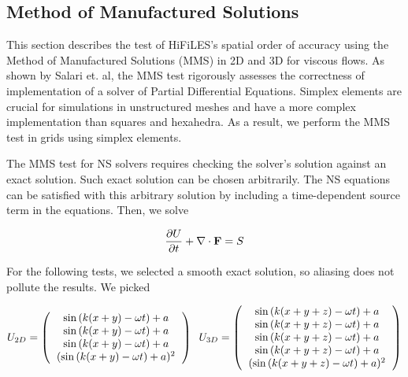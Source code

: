 \graphicspath{{figures_manufactured/}}%


\subsection{Method of Manufactured Solutions}

This section describes the test of HiFiLES's spatial order of accuracy using the Method of Manufactured Solutions (MMS) in 2D and 3D for viscous flows. As shown by Salari et. al\cite{salari2000code}, the MMS test rigorously assesses the correctness of implementation of a solver of Partial Differential Equations. Simplex elements are crucial for simulations in unstructured meshes and have a more complex implementation than squares and hexahedra. As a result, we perform the MMS test in grids using simplex elements.

The MMS test for NS solvers requires checking the solver's solution against an exact solution. Such exact solution can be chosen arbitrarily. The NS equations can be satisfied with this arbitrary solution by including a time-dependent source term in the equations. Then, we solve

\begin{equation}
\frac{\partial U}{\partial t} +  \nabla \cdot {\bf F} = S
\end{equation}

For the following tests, we selected a smooth exact solution, so aliasing does not pollute the results. We picked

\begin{equation}\label{eq:NSwithSource}
U_{2D} = \l(
\begin{tabular}{c}
$\sin{(k(x+y) - \omega t)} + a$\\
$\sin{(k(x+y) - \omega t)} + a$\\
$\sin{(k(x+y) - \omega t)} + a$\\
$(\sin{(k(x+y) - \omega t)} + a)^2$
\end{tabular}
\r) \;\; 
U_{3D} = \l(
\begin{tabular}{c}
$\sin{(k(x+y+z) - \omega t)} + a$\\
$\sin{(k(x+y+z) - \omega t)} + a$\\
$\sin{(k(x+y+z) - \omega t)} + a$\\
$\sin{(k(x+y+z) - \omega t)} + a$\\
$(\sin{(k(x+y+z) - \omega t)} + a)^2$
\end{tabular}
\r)
\end{equation}

